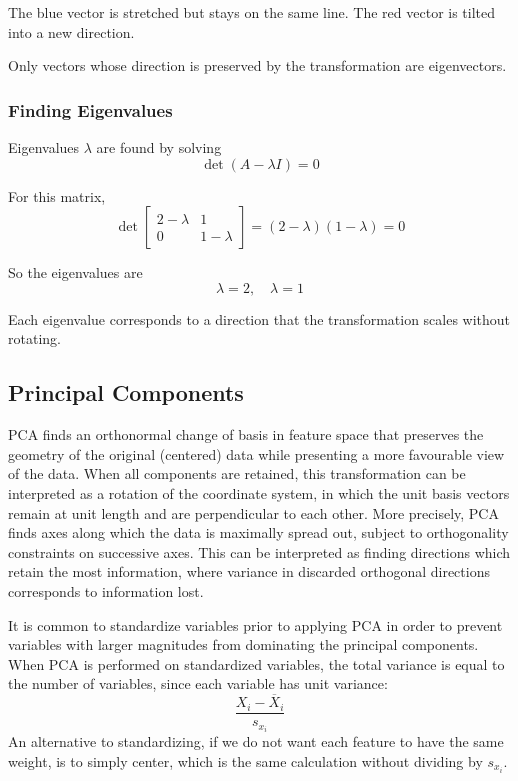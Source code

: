The blue vector is stretched but stays on the same line.  
The red vector is tilted into a new direction.

\medskip

Only vectors whose direction is preserved by the transformation are eigenvectors.

\subsubsection*{Finding Eigenvalues}

Eigenvalues \( \lambda \) are found by solving
\[
\det(A - \lambda I) = 0
\]

For this matrix,
\[
\det
\begin{bmatrix}
2 - \lambda & 1 \\
0 & 1 - \lambda
\end{bmatrix}
=
(2 - \lambda)(1 - \lambda)
= 0
\]

So the eigenvalues are
\[
\lambda = 2, \quad \lambda = 1
\]

Each eigenvalue corresponds to a direction that the transformation scales without rotating.






\bigskip

\subsection{Principal Components}

\medskip

PCA finds an orthonormal change of basis in feature space that preserves the geometry of the original (centered) data while presenting a more favourable view of the data. When all components are retained, this transformation can be interpreted as a rotation of the coordinate system, in which the unit basis vectors remain at unit length and are perpendicular to each other. More precisely, PCA finds axes along which the data is maximally spread out, subject to orthogonality constraints on successive axes. This can be interpreted as finding directions which retain the most information, where variance in discarded orthogonal directions corresponds to information lost.

It is common to standardize variables prior to applying PCA in order to prevent variables with larger magnitudes from dominating the principal components. When PCA is performed on standardized variables, the total variance is equal to the number of variables, since each variable has unit variance:
\[
\frac{X_i - \overline{X}_i}{s_{x_i}}
\]
An alternative to standardizing, if we do not want each feature to have the same weight, is to simply center, which is the same calculation without dividing by $s_{x_i}$.

